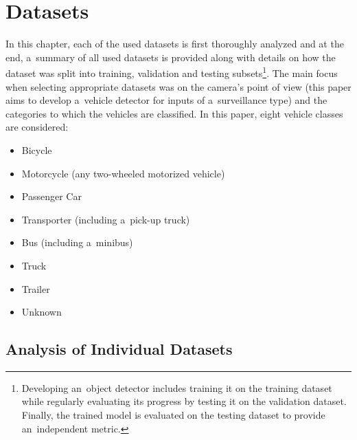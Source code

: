 



\chapter{Datasets}
\label{DatasetsChapter}


In this chapter, each of the used datasets is first thoroughly analyzed and at
the end, a~summary of all used datasets is provided along with details on how
the dataset was split into training, validation and testing
subsets\footnote{Developing an~object detector includes training it on the
training dataset while regularly evaluating its progress by testing it on the
validation dataset. Finally, the trained model is evaluated on the testing
dataset to provide an~independent metric.}. The main focus when selecting
appropriate datasets was on the camera's point of view (this paper aims to
develop a~vehicle detector for inputs of a~surveillance type) and the categories
to which the vehicles are classified. In this paper, eight vehicle classes are
considered:
\begin{itemize}
    \item Bicycle
    \item Motorcycle (any two-wheeled motorized vehicle)
    \item Passenger Car
    \item Transporter (including a~pick-up truck)
    \item Bus (including a~minibus)
    \item Truck
    \item Trailer
    \item Unknown
\end{itemize}


\section{Analysis of Individual Datasets}

